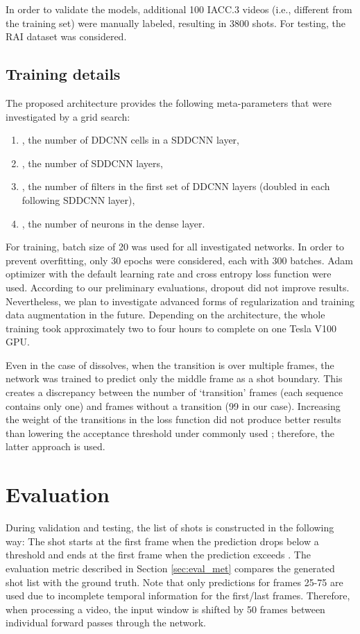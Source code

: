 In order to validate the models, additional 100 IACC.3 videos (i.e., different from the training set) were manually labeled, resulting in 3800 shots. For testing, the RAI dataset \cite{Baraldi15} was considered.


\subsection{Training details}
The proposed architecture provides the following meta-parameters that were investigated by a grid search:

\begin{enumerate}
\item , the number of DDCNN cells in a SDDCNN layer,
\item , the number of SDDCNN layers,
\item , the number of filters in the first set of DDCNN layers (doubled in each following SDDCNN layer),
\item , the number of neurons in the dense layer.
\end{enumerate}

For training, batch size of 20 was used for all investigated networks. In order to prevent overfitting, only 30 epochs were  considered, each with 300 batches. Adam optimizer \cite{Adam14} with the default learning rate  and cross entropy loss function were used. According to our preliminary evaluations, dropout did not improve results. Nevertheless, we plan to investigate advanced forms of regularization and training data augmentation in the future. Depending on the architecture, the whole training took approximately two to four hours to complete on one Tesla V100 GPU.

Even in the case of dissolves, when the transition is over multiple frames, the network was trained to predict only the middle frame as a shot boundary. This creates a discrepancy between the number of `transition' frames (each sequence contains only one) and frames without a transition (99 in our case). 
Increasing the weight of the transitions in the loss function did not produce better results than lowering the acceptance threshold  under commonly used ; therefore, the latter approach is used.

\section{Evaluation}
During validation and testing, the list of shots is constructed in the following way: The shot starts at the first frame when the prediction drops below a threshold  and ends at the first frame when the prediction exceeds . The evaluation metric described in Section \ref{sec:eval_met} compares the generated shot list with the ground truth. Note that only predictions for frames 25-75 are used due to incomplete temporal information for the first/last frames. Therefore, when processing a video, the input window is shifted by 50 frames between individual forward passes through the network.

